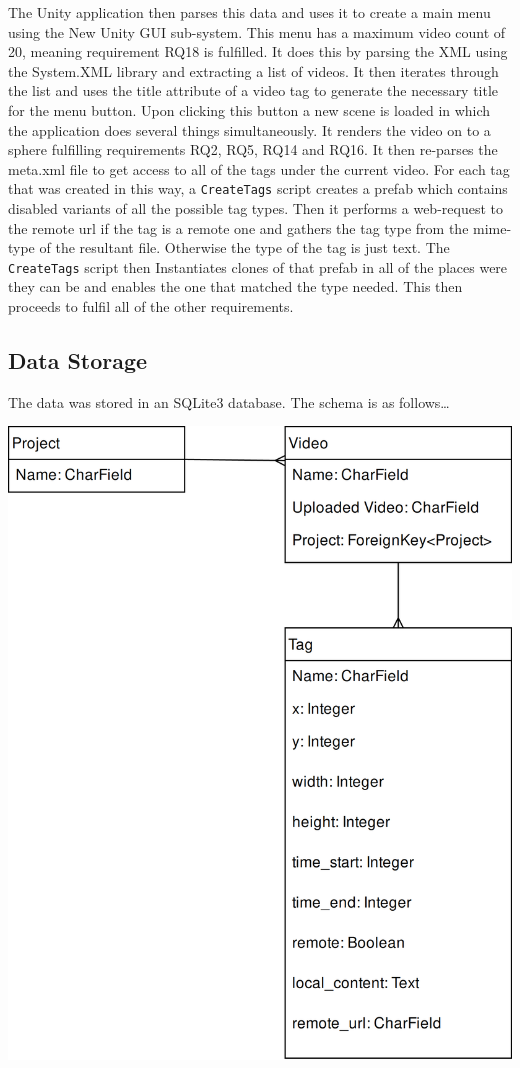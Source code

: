 \documentclass[12pt]{report}
\newcommand{\inlinecode}{\texttt}
\begin{document}
The Unity application then parses this data and uses it to create a main menu using the New Unity GUI sub-system. This menu has a maximum video count of 20, meaning requirement RQ18 is fulfilled. It does this by parsing the XML using the System.XML library and extracting a list of videos. It then iterates through the list and uses the title attribute of a video tag to generate the necessary title for the menu button. Upon clicking this button a new scene is loaded in which the application does several things simultaneously. It renders the video on to a sphere fulfilling requirements RQ2, RQ5, RQ14 and RQ16. It then re-parses the meta.xml file to get access to all of the tags under the current video. For each tag that was created in this way, a \inlinecode{CreateTags} script creates a prefab which contains disabled variants of all the possible tag types. Then it performs a web-request to the remote url if the tag is a remote one and gathers the tag type from the mime-type of the resultant file. Otherwise the type of the tag is just text. The \inlinecode{CreateTags} script then Instantiates clones of that prefab in all of the places were they can be and enables the one that matched the type needed. This then proceeds to fulfil all of the other requirements. 

\subsection{Data Storage}
The data was stored in an SQLite3 database. The schema is as follows\ldots

\includegraphics[height=\textwidth]{er_diagram}
\clearpage
\end{document}
